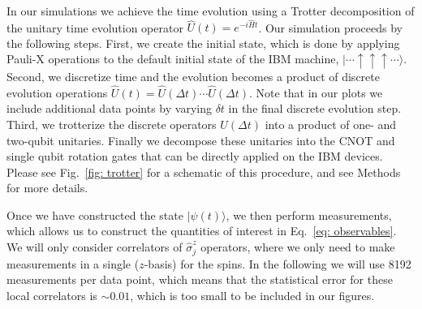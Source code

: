 \documentclass[twocolumn,showpacs,preprintnumbers,nofootinbib,amsmath,aps,pra,longbibliography,amssymb,superscriptaddress]{revtex4-1}
\newcommand{\ra}{\rangle}
\begin{document}
In our simulations we achieve the time evolution using a Trotter decomposition of the unitary time evolution operator $\hat{U}(t) = e^{-i\hat{H}t}$. Our simulation proceeds by the following steps. First, we create the initial state, which is done by applying Pauli-X operations to the default initial state of the IBM machine, $|\cdots \uparrow\uparrow\uparrow \cdots \ra$. Second, we discretize time and the evolution becomes a product of discrete evolution operations $\hat{U}(t) = \hat{U}(\Delta t) \cdots \hat{U}(\Delta t)$. Note that in our plots we include additional data points by varying $\delta t$ in the final discrete evolution step. Third, we trotterize the discrete operators $U(\Delta t)$ into a product of one- and two-qubit unitaries. Finally we decompose these unitaries into the CNOT and single qubit rotation gates that can be directly applied on the IBM devices. Please see Fig.~\ref{fig: trotter} for a schematic of this procedure, and see Methods for more details.







Once we have constructed the state $|\psi(t)\ra$, we then perform measurements, which allows us to construct the quantities of interest in Eq.~\eqref{eq: observables}. We will only consider correlators of $\hat{\sigma}^z_j$ operators, where we only need to make measurements in a single ($z$-basis) for the spins. In the following we will use 8192 measurements per data point, which means that the statistical error for these local correlators is $\sim 0.01$, which is too small to be included in our figures.
\end{document}
